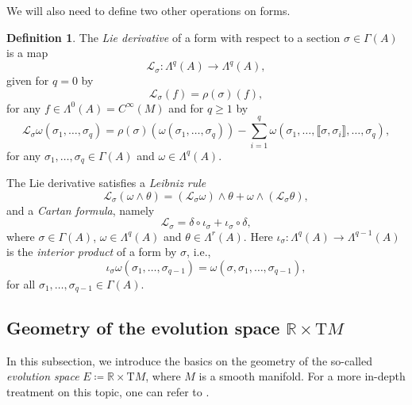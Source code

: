 \documentclass[11pt]{article}
\theoremstyle{plain}
\theoremstyle{definition}
\newtheorem{definition}{Definition}
\begin{document}
We will also need to define two other operations on forms.
\begin{definition}
The \emph{Lie derivative} of a form with respect to a section $\sigma\in \Gamma(A)$ is a map
\begin{equation*}
    \mathcal{L}_{\sigma}\colon \Lambda^q(A)\longrightarrow \Lambda^q(A),
\end{equation*}
given for $q=0$ by
\begin{equation*}
    \mathcal{L}_{\sigma}(f)=\rho(\sigma)(f),
\end{equation*}
for any $f\in \Lambda^0(A)=C^{\infty}(M)$ and for $q\geq 1$ by
\begin{equation*}
    \mathcal{L}_{\sigma} \omega(\sigma_1,\dots,\sigma_q)=\rho(\sigma)(\omega(\sigma_1,\dots,\sigma_q))-\sum_{i=1}^q \omega(\sigma_1,\dots,\llbracket \sigma,\sigma_i\rrbracket,\dots,\sigma_q),
\end{equation*}
for any $\sigma_1,\dots,\sigma_q\in \Gamma(A)$ and $\omega\in \Lambda^q(A)$.
\end{definition}

The Lie derivative satisfies a \emph{Leibniz rule}
\begin{equation*}
    \mathcal{L}_{\sigma}(\omega\wedge \theta)=(\mathcal{L}_{\sigma}\omega)\wedge \theta+\omega\wedge (\mathcal{L}_{\sigma}\theta),
\end{equation*}
and a \emph{Cartan formula}, namely
\begin{equation*}
    \mathcal{L}_{\sigma}=\delta\circ \iota_{\sigma}+\iota_{\sigma}\circ \delta,
\end{equation*}
where $\sigma\in \Gamma(A)$, $\omega\in \Lambda^q(A)$ and $\theta\in \Lambda^r(A)$. Here $\iota_{\sigma}\colon \Lambda^q(A)\to \Lambda^{q-1}(A)$ is the \emph{interior product} of a form by $\sigma$, i.e.,
\begin{equation*}
    \iota_{\sigma}\omega(\sigma_1,\dots,\sigma_{q-1})=\omega(\sigma,\sigma_1,\dots,\sigma_{q-1}),
\end{equation*}
for all $\sigma_1,\dots,\sigma_{q-1}\in \Gamma(A)$.

\subsection{\texorpdfstring{Geometry of the evolution space $\mathbb{R}\times \mathrm{T}M$}{Geometry of the evolution space R x TM}}\label{subsec:evolution}

In this subsection, we introduce the basics on the geometry of the so-called \emph{evolution space} $E\coloneqq \mathbb{R}\times \mathrm{T}M$, where $M$ is a smooth manifold. For a more in-depth treatment on this topic, one can refer to \cite{crampin1984geohelmholtz,do2016invprob,krupkova2007jetbundles}.
\end{document}
